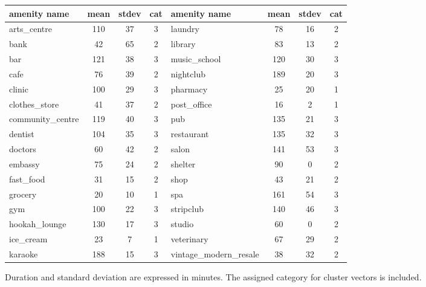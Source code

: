 \documentclass{ws-ijait}
\begin{document}
	\begin{table}[!ht]
			{\begin{tabular}{ | l | c | c | c || l | c | c | c |}
					\hline		
					\textbf{amenity name} & \textbf{mean} & \textbf{stdev} & \textbf{cat} & \textbf{amenity name} & \textbf{mean} & \textbf{stdev} & \textbf{cat} \\ \hline
					arts\_centre  & 110 & 37 & 3 & laundry  & 78 & 16 & 2 \\ \hline
					bank  & 42 & 65 & 2 &  library  & 83 & 13 & 2 \\ \hline
					bar  & 121 & 38 & 3 &  music\_school  & 120 & 30 & 3 \\ \hline
					cafe  & 76 & 39 & 2 &  nightclub  & 189 & 20 & 3 \\ \hline
					clinic  & 100 & 29 & 3 &  pharmacy  & 25 & 20 & 1 \\ \hline
					clothes\_store  & 41 & 37 & 2 &  post\_office  & 16 & 2 & 1 \\ \hline
					community\_centre  & 119 & 40 & 3 &  pub  & 135 & 21 & 3 \\ \hline
					dentist  & 104 & 35 & 3 &  restaurant  & 135 & 32 & 3 \\ \hline
					doctors  & 60 & 42 & 2 &  salon  & 141 & 53 & 3 \\ \hline
					embassy  & 75 & 24 & 2 &  shelter  & 90 & 0 & 2 \\ \hline
					fast\_food  & 31 & 15 & 2 &  shop  & 43 & 21 & 2 \\ \hline
					grocery  & 20 & 10 & 1 &  spa  & 161 & 54 & 3 \\ \hline
					gym  & 100 & 22 & 3 &  stripclub  & 140 & 46 & 3 \\ \hline
					hookah\_lounge  & 130 & 17 & 3 &  studio  & 60 & 0 & 2 \\ \hline
					ice\_cream  & 23 & 7 & 1 &  veterinary  & 67 & 29 & 2 \\ \hline
					karaoke  & 188 & 15 & 3 & {\scriptsize vintage\_modern\_resale}  & 38 & 32 & 2 \\ \hline
			\end{tabular}}
			\label{tab:amenities_google_places}
			\begin{tabnote}
				Duration and standard deviation are expressed in minutes. The assigned category for cluster vectors is included.
			\end{tabnote}
	\end{table}
						
\end{document}
